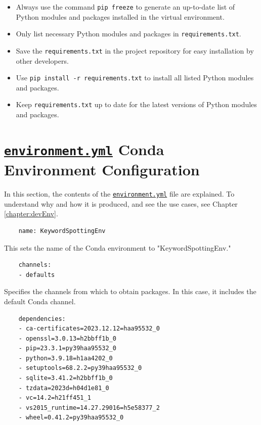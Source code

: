 \begin{itemize}
	\item Always use the command \texttt{pip freeze} to generate an up-to-date list of Python modules and packages installed in the virtual environment.
	\item Only list necessary Python modules and packages in \texttt{requirements.txt}.
	\item Save the \texttt{requirements.txt} in the project repository for easy installation by other developers.
	\item Use \texttt{pip install -r requirements.txt} to install all listed Python modules and packages.
	\item Keep \texttt{requirements.txt} up to date for the latest versions of Python modules and packages.
\end{itemize}


\section{\href{run:../Code/KeywordSpotting/envRequirements/environment.yml}{\texttt{environment.yml}} Conda Environment Configuration}
\label{section:CondaEnvConfig}

In this section, the contents of the \href{run:../Code/KeywordSpotting/envRequirements/environment.yml}{\texttt{environment.yml}} file are explained. To understand why and how it is produced, and see the use cases, see Chapter \ref{chapter:devEnv}.

\begin{verbatim}
	name: KeywordSpottingEnv
\end{verbatim}

This sets the name of the Conda environment to "KeywordSpottingEnv."

\begin{verbatim}
	channels:
	- defaults
\end{verbatim}

Specifies the channels from which to obtain packages. In this case, it includes the default Conda channel.

\begin{verbatim}
	dependencies:
	- ca-certificates=2023.12.12=haa95532_0
	- openssl=3.0.13=h2bbff1b_0
	- pip=23.3.1=py39haa95532_0
	- python=3.9.18=h1aa4202_0
	- setuptools=68.2.2=py39haa95532_0
	- sqlite=3.41.2=h2bbff1b_0
	- tzdata=2023d=h04d1e81_0
	- vc=14.2=h21ff451_1
	- vs2015_runtime=14.27.29016=h5e58377_2
	- wheel=0.41.2=py39haa95532_0
\end{verbatim}

